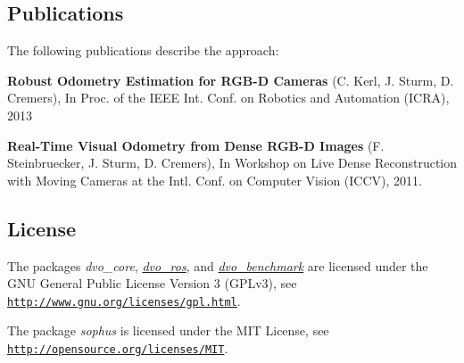 \subsection*{Publications}

The following publications describe the approach\+:


\begin{DoxyItemize}
\item {\bfseries Robust Odometry Estimation for R\+G\+B-\/D Cameras} (C. Kerl, J. Sturm, D. Cremers), In Proc. of the I\+E\+EE Int. Conf. on Robotics and Automation (I\+C\+RA), 2013
\item {\bfseries Real-\/\+Time Visual Odometry from Dense R\+G\+B-\/D Images} (F. Steinbruecker, J. Sturm, D. Cremers), In Workshop on Live Dense Reconstruction with Moving Cameras at the Intl. Conf. on Computer Vision (I\+C\+CV), 2011.
\end{DoxyItemize}

\subsection*{License}

The packages {\itshape dvo\+\_\+core}, {\itshape \mbox{\hyperlink{namespacedvo__ros}{dvo\+\_\+ros}}}, and {\itshape \mbox{\hyperlink{namespacedvo__benchmark}{dvo\+\_\+benchmark}}} are licensed under the G\+NU General Public License Version 3 (G\+P\+Lv3), see \href{http://www.gnu.org/licenses/gpl.html}{\tt http\+://www.\+gnu.\+org/licenses/gpl.\+html}.

The package {\itshape sophus} is licensed under the M\+IT License, see \href{http://opensource.org/licenses/MIT}{\tt http\+://opensource.\+org/licenses/\+M\+IT}. 